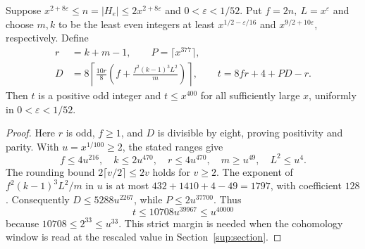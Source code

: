 \begin{lemma}\label{host:rank}
Suppose \(x^{2+8\varepsilon}\le n=|H_e|\le2x^{2+8\varepsilon}\) and
\(0<\varepsilon<1/52\). Put \(f=2n,\ L=x^\varepsilon\) and choose \(m,k\)
to be the least even integers at least \(x^{1/2-\varepsilon/16}\) and
\(x^{9/2+10\varepsilon}\), respectively. Define
\[
 \begin{split}
 r&=k+m-1,\qquad P=\lceil x^{377}\rceil,\\
 D&=8\left\lceil \frac{10r}{8}
       \left(f+\frac{f^2(k-1)^3L^2}{m}\right)\right\rceil,\qquad
 t=8fr+4+PD-r .
 \end{split}
\]
Then \(t\) is a positive odd integer and \(t\le x^{400}\) for all
sufficiently large \(x\), uniformly in \(0<\varepsilon<1/52\).
\end{lemma}
\begin{proof}
Here \(r\) is odd, \(f\ge1\), and \(D\) is divisible by eight, proving
positivity and parity. With \(u=x^{1/100}\ge2\), the stated ranges give
\[
 f\le4u^{216},\quad k\le2u^{470},\quad r\le4u^{470},\quad
 m\ge u^{49},\quad L^2\le u^4.
\]
The rounding bound \(2\lceil v/2\rceil\le2v\) holds for \(v\ge2\).
The exponent of \(f^2(k-1)^3L^2/m\) in \(u\) is at most
\(432+1410+4-49=1797\), with coefficient \(128\). Consequently
\(D\le5288u^{2267}\), while \(P\le2u^{37700}\). Thus
\[
 t\le 10708u^{39967}\le u^{40000}
\]
because \(10708\le2^{33}\le u^{33}\). This strict margin is needed
when the cohomology window is read at the rescaled value in
Section~\ref{sup:section}.
\end{proof}

